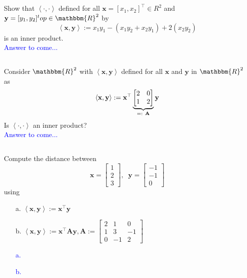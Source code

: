 \documentclass[a4paper,12pt]{article}
\newcommand{\Ubr}[2]{\underbrace{ #1 }_{\mathclap{\text{ #2 }}}}
\newcommand{\R}{\mathbbm{R}}
\newcommand{\M}[1]{ \begin{bmatrix} #1 \end{bmatrix} }
\newcommand{\vsp}[1]{\vspace{#1mm}\\}
\newcommand{\vecx}{\textbf{x}}
\newcommand{\vecy}{\textbf{y}}
\newcommand{\matA}{\textbf{A}}
\begin{document}
\subsection{}
Show that $\left< \cdot,\cdot \right>$ defined for all $\vecx = [x_1, x_2]^\top \in R^2$ and $\vecy = [y_1,y_2]^top \in \R^2$ by
$$\left< \vecx, \vecy \right> := x_1 y_1 - (x_1y_2 + x_2y_1) + 2(x_2y_2)$$
is an inner product.
\vsp{3}
\textcolor{blue}{
Answer to come...
}
\subsection{}
Consider $\R^2$ with $\left< \vecx, \vecy \right>$ defined for all $\vecx$ and $\vecy$ in $\R^2$ as
$$\left< \vecx, \vecy \right> := \vecx^\top \Ubr{\M{2&0\\1&2}}{=: \matA} \vecy$$
Is $\left< \cdot, \cdot \right>$ an inner product?
\vsp{3}
\textcolor{blue}{
Answer to come...
}
\subsection{}
Compute the distance between
$$\vecx=\M{1\\2\\3}, \;\; \vecy = \M{-1\\-1\\0}$$
using
\begin{itemize}
 \item [a.] $\left< \vecx, \vecy \right> := \vecx^\top \vecy$
 \item [b.] $\left< \vecx, \vecy \right> := \vecx^\top \matA \vecy, \matA := \M{2&1&0\\1&3&-1\\0&-1&2}$
\end{itemize}
\textcolor{blue}{
\begin{itemize}
 \item [a.]
 \item [b.]
\end{itemize}
}
\end{document}
